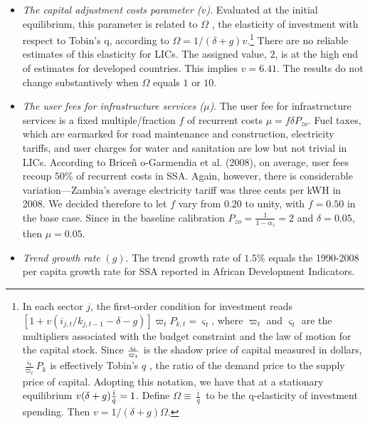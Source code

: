 \documentclass[11pt]{article}
\begin{document}
\begin{itemize}
\item \textit{The capital adjustment costs parameter (}$v$\textit{)}.
Evaluated at the initial equilibrium, this parameter is related to $\Omega $%
, the elasticity of investment with respect to Tobin's q, according to $%
\Omega =1/(\delta +g)v$.\footnote{%
In each sector $j$, the first-order condition for investment reads $%
[1+v(i_{j,t}/k_{j,t-1}-\delta -g)]\varpi _{t}P_{k,t}=\varsigma _{t}$, where $%
\varpi _{t}$ and $\varsigma _{t}$ are the multipliers associated with the
budget constraint and the law of motion for the capital stock. Since $\frac{%
\varsigma _{t}}{\varpi _{t}}$ is the shadow price of capital measured in
dollars, $\frac{\varsigma _{t}}{\varpi _{t}}P_{k}$ is effectively Tobin's $q$%
, the ratio of the demand price to the supply price of capital. Adopting
this notation, we have that at a stationary equilibrium $v(\delta +g)\frac{%
\bar{\imath}}{\bar{q}}=1$. Define $\Omega \equiv \frac{\bar{\imath}}{\bar{q}}
$ to be the q-elasticity of investment spending. Then $v=1/(\delta +g)\Omega 
$.} There are no reliable estimates of this elasticity for LICs. The
assigned value, $2$, is at the high end of estimates for developed
countries. This implies $v=6.41.$ The results do not change substantively
when $\Omega $ equals $1$ or $10$.

\item \textit{The user fees for infrastructure services (}$\mu $\textit{)}.
The user fee for infrastructure services is a fixed multiple/fraction $f$ of
recurrent costs $\mu =f\delta P_{zo}$. Fuel taxes, which are earmarked for
road maintenance and construction, electricity tariffs, and user charges for
water and sanitation are low but not trivial in LICs. According to Brice\~{n}%
o-Garmendia et al. (2008), on average, user fees recoup $50\%$ of recurrent
costs in SSA. Again, however, there is considerable variation---Zambia's
average electricity tariff was three cents per kWH in 2008. We decided
therefore to let $f$ vary from $0.20$ to unity, with $f=0.50$ in the base
case. Since in the baseline calibration $P_{zo}=\frac{1}{1-\alpha _{z}}=2$
and $\delta =0.05$, then $\mu =0.05$.

\item \textit{Trend growth rate }$(g)$. The trend growth rate of $1.5\%$
equals the 1990-2008 per capita growth rate for SSA reported in African
Development Indicators.


\end{itemize}
\end{document}
